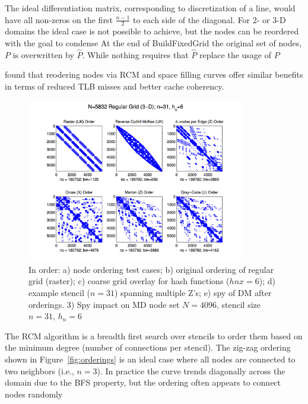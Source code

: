 \documentclass{report}
\begin{document}
The ideal differentiation matrix, corresponding to discretization of a line, would have all non-zeros on the first $\frac{n-1}{2}$ to each side of the diagonal. For 2- or 3-D domains the ideal case is not possible to achieve, but the nodes can be reordered with the goal to condense
At the end of BuildFixedGrid the original set of nodes, $P$ is overwritten by $\hat{P}$. While nothing requires that $\hat{P}$ replace the usage of $P$ 



\cite{MellorCrummey2001} found that reodering nodes via RCM and space filling curves offer similar benefits in terms of reduced TLB misses and better cache coherency. 





\begin{figure}
\centering
\includegraphics[width=0.85\textwidth]{rbffd_methods_content/hashing/spy_regulargrid_N18d3_n31_hn6.png} 
\caption{In order: a) node ordering test cases; b) original ordering of regular grid (raster); c) coarse grid overlay for hash functions ($hnx = 6$); d) example stencil ($n=31$) spanning multiple Z's; e) spy of DM after orderings.  3) Spy impact on MD node set $N=4096$, stencil size $n=31$, $h_n = 6$ }
\label{fig:ordering_impact_rg}
\end{figure}


The RCM algorithm is a breadth first search over stencils to order them based on the minimum degree (number of connections per stencil). The zig-zag ordering shown in Figure~\ref{fig:orderings} is an ideal case where all nodes are connected to two neighbors (i.e., $n=3$). In practice the curve trends diagonally across the domain due to the BFS property, but the ordering often appears to connect nodes randomly 
\end{document}
